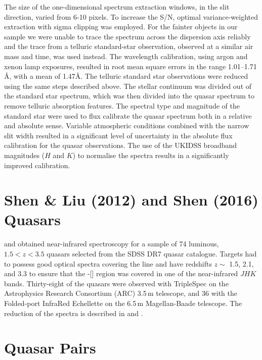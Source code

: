 The size of the one-dimensional spectrum extraction windows, in the slit direction, varied from 6-10 pixels. 
To increase the S/N, optimal variance-weighted extraction with sigma clipping was employed. 
For the fainter objects in our sample we were unable to trace the spectrum across the dispersion axis reliably and the trace from a telluric standard-star observation, observed at a similar air mass and time, was used instead. 
The wavelength calibration, using argon and xenon lamp exposures, resulted in root mean square errors in the range 1.01--1.71\,\AA, with a mean of 1.47\AA. 
The telluric standard star observations were reduced using the same steps described above. 
The stellar continuum was divided out of the standard star spectrum, which was then divided into the quasar spectrum to remove telluric absorption features. 
The spectral type and magnitude of the standard star were used to flux calibrate the quasar spectrum both in a relative and absolute sense.
Variable atmospheric conditions combined with the narrow slit width resulted in a significant level of uncertainty in the absolute flux calibration for the quasar observations. 
The use of the UKIDSS broadband magnitudes ($H$ and $K$) to normalise the spectra results in a significantly improved calibration. 

\section{Shen \& Liu (2012) and Shen (2016) Quasars}

\citet{shen16a} and \citet{shen12} obtained near-infrared spectroscopy for a sample of 74 luminous, $1.5 < z < 3.5$ quasars selected from the SDSS DR7 quasar catalogue. 
Targets had to possess good optical spectra covering the  line and have redshifts $z\sim$ 1.5, 2.1, and 3.3 to ensure that the \hbns-[] region was covered in one of the near-infrared $JHK$ bands.
Thirty-eight of the quasars were observed with TripleSpec \citep{wilson04} on the Astrophysics Research Consortium (ARC) 3.5\,m telescope, and 36 with the Folded-port InfraRed Echellette \citep[FIRE;][]{simcoe10} on the 6.5\,m Magellan-Baade telescope.
The reduction of the spectra is described in \citet{shen16a} and \citet{shen12}. 

\section{Quasar Pairs}

